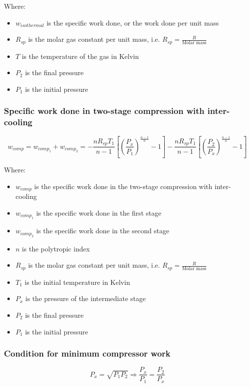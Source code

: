 \documentclass[11pt]{article}
\begin{document}
Where:
\begin{itemize}
\item \(w_{isothermal}\) is the specific work done, or the work done per unit mass
\item \(R_{sp}\) is the molar gas constant per unit mass, i.e. \(R_{sp} = \frac{R}{\text{Molar mass}}\)
\item \(T\) is the temperature of the gas in Kelvin
\item \(P_2\) is the final pressure
\item \(P_1\) is the initial pressure
\end{itemize}

\subsubsection{Specific work done in two-stage compression with inter-cooling}
\label{sec:org5c4d828}
\[w_{comp} = w_{comp_1} + w_{comp_2} = - \frac{n R_{sp} T_1}{n - 1} \left[\left(\frac{P_x}{P_1} \right)^{\frac{n - 1}{n}} - 1 \right] - \frac{n R_{sp} T_1}{n - 1} \left[\left(\frac{P_2}{P_x} \right)^{\frac{n - 1}{n}} - 1 \right]\]

Where:
\begin{itemize}
\item \(w_{comp}\) is the specific work done in the two-stage compression with inter-cooling
\item \(w_{comp_1}\) is the specific work done in the first stage
\item \(w_{comp_2}\) is the specific work done in the second stage
\item \(n\) is the polytropic index
\item \(R_{sp}\) is the molar gas constant per unit mass, i.e. \(R_{sp} = \frac{R}{\text{Molar mass}}\)
\item \(T_1\) is the initial temperature in Kelvin
\item \(P_x\) is the pressure of the intermediate stage
\item \(P_2\) is the final pressure
\item \(P_1\) is the initial pressure
\end{itemize}

\subsubsection{Condition for minimum compressor work}
\label{sec:org0585451}
\[P_x = \sqrt{P_1 P_2} \Rightarrow \frac{P_x}{P_1} = \frac{P_2}{P_x}\]
\end{document}
